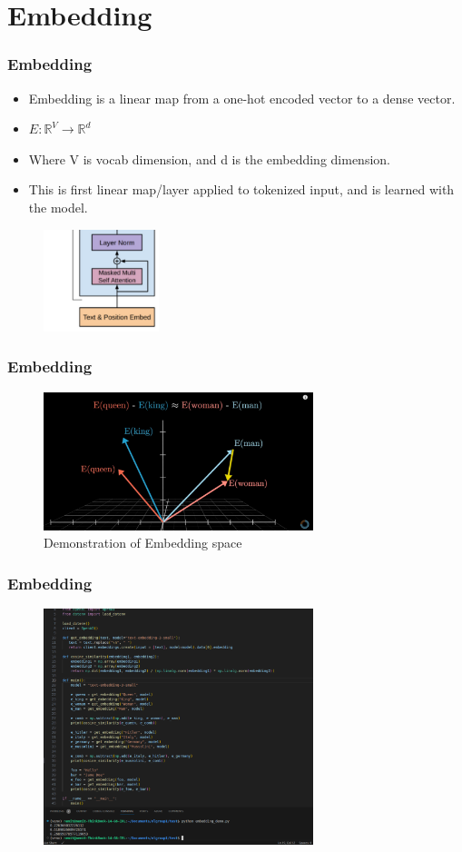 \documentclass[
    10pt %
    16:9, %
]{beamer}
\begin{document}
\section{Embedding}

\frame
{
  \frametitle{Embedding}
  \begin{itemize}
      \item Embedding is a linear map from a one-hot encoded vector to  a dense vector.
      \item $E: \mathbb{R}^{V} \rightarrow \mathbb{R}^{d}$
      \item Where V is vocab dimension, and d is the embedding dimension.
      \item This is first linear map/layer applied to tokenized input, and is learned with the model.
  \end{itemize}
  \begin{figure}
    \centering
    \includegraphics[width=0.3\textwidth]{model.png}
  \end{figure}
}

\frame
{
  \frametitle{Embedding}
  \begin{figure}
    \centering
    \includegraphics[width=0.7\textwidth]{3blue1brown.png}
    \caption{Demonstration of Embedding space}
  \end{figure}
}

\frame
{
  \frametitle{Embedding}
  \begin{figure}
    \centering
    \includegraphics[width=0.7\textwidth]{similarity.png}
  \end{figure}
}
\end{document}
